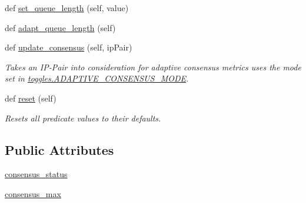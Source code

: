 \begin{DoxyCompactItemize}
\item 
def \mbox{\hyperlink{classdynamicfilterapp_1_1models_1_1_predicate_adb36a52d2acdedc33d742d219e0acf7e}{set\+\_\+queue\+\_\+length}} (self, value)
\item 
def \mbox{\hyperlink{classdynamicfilterapp_1_1models_1_1_predicate_a18b5417d8a8cf64ffbc6bb32c2a573fa}{adapt\+\_\+queue\+\_\+length}} (self)
\item 
def \mbox{\hyperlink{classdynamicfilterapp_1_1models_1_1_predicate_a34ad16d30b9a279473a83b2c43dedfa1}{update\+\_\+consensus}} (self, ip\+Pair)
\begin{DoxyCompactList}\small\item\em Takes an I\+P-\/\+Pair into consideration for adaptive consensus metrics uses the mode set in \mbox{\hyperlink{namespacedynamicfilterapp_1_1toggles_a394fa3f8531c2ecc987f982367a4af2d}{toggles.\+A\+D\+A\+P\+T\+I\+V\+E\+\_\+\+C\+O\+N\+S\+E\+N\+S\+U\+S\+\_\+\+M\+O\+DE}}. \end{DoxyCompactList}\item 
def \mbox{\hyperlink{classdynamicfilterapp_1_1models_1_1_predicate_a51829b63adb24ac48d350dee60181002}{reset}} (self)
\begin{DoxyCompactList}\small\item\em Resets all predicate values to their defaults. \end{DoxyCompactList}\end{DoxyCompactItemize}
\subsection*{Public Attributes}
\begin{DoxyCompactItemize}
\item 
\mbox{\hyperlink{classdynamicfilterapp_1_1models_1_1_predicate_aed00cc02057c0555b36ade73a3403506}{consensus\+\_\+status}}
\item 
\mbox{\hyperlink{classdynamicfilterapp_1_1models_1_1_predicate_a2b21ce84993e15a328a68bcbbe8986ef}{consensus\+\_\+max}}
\end{DoxyCompactItemize}
